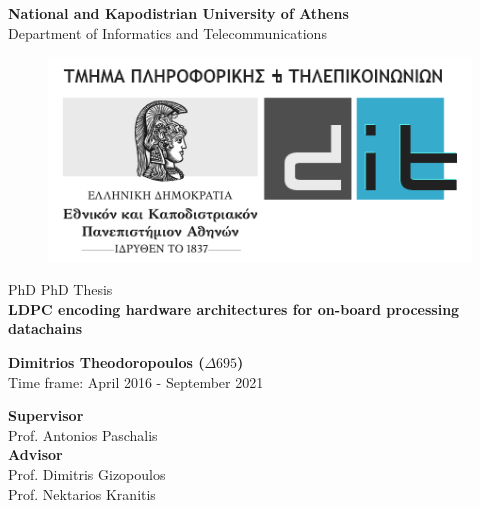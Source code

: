 \documentclass[a4paper, titlepage, 12pt]{article}
\newcommand{\thesisTitle}{LDPC encoding hardware architectures for on-board processing datachains}
\newcommand{\name}{Dimitrios Theodoropoulos ($\Delta 695$)}
\newcommand{\timeFrame}{April 2016 - September 2021}
\newcommand{\supervisor}{Prof. Antonios Paschalis}
\newcommand{\advisor}{Prof. Dimitris Gizopoulos \\ Prof. Nektarios Kranitis}
\newcommand{\thesisType}{PhD}
\begin{document}
\begin{titlepage}
\begin{center}
\LARGE{\textbf{National and Kapodistrian University of Athens}}\\
\normalsize{Department of Informatics and Telecommunications}\\[0.3cm]

\begin{figure}[h!]
    \centering
    \includegraphics[width=0.7\linewidth]{logo_el.png}
\end{figure}
\vspace{1cm}

\LARGE{{\thesisType} PhD Thesis}\\[0.7cm]
\Huge{\textbf{\thesisTitle}}

\vspace{1cm} 

\Large{\textbf{\name}} \\[3pt]  
\vspace{0.5cm}
\large{Time frame: \timeFrame} \\ 

\vspace{1cm}

\large{\textbf{Supervisor}}\\
\supervisor\\
\vspace{0.5cm}
\textbf{Advisor}\\
\advisor\\
\end{center}
\end{titlepage}
\tableofcontents
\clearpage

\clearpage

\clearpage

\clearpage

\clearpage

{\small 

}
\end{document}
